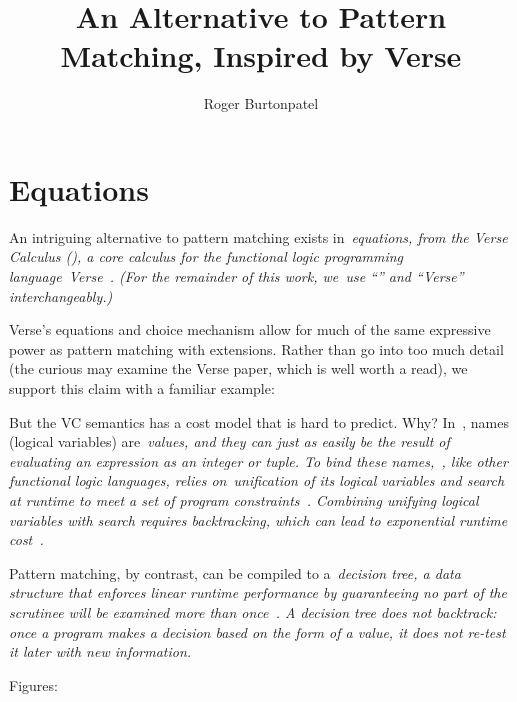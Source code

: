 \documentclass[manuscript,screen 12pt, nonacm]{acmart}
\title{An Alternative to Pattern Matching, Inspired by Verse}
\author{Roger Burtonpatel}
\affiliation{%
  \institution{Tufts University}
  \streetaddress{419 Boston Ave}
  \city{Medford}
  \state{Massachusetts}
  \country{USA}
  \postcode{02155}
}
\begin{document}
    
    \section{Equations}

    An intriguing alternative to pattern matching exists in~\it{equations}, from
    the Verse Calculus (\VC), a core calculus for the functional logic
    programming language~\it{Verse}~\citep{antoy2010functional,
    hanus2013functional, verse}. (For the remainder of this work, we~use “\VC”
    and “Verse” interchangeably.)

    Verse's equations and choice mechanism allow for much of the same expressive
    power as pattern matching with extensions. Rather than go into too much
    detail (the curious may examine the Verse paper, which is well worth a
    read), we support this claim with a familiar example: 


    But the VC semantics has a cost model that is hard to predict. Why? In~\VC,
    names (logical variables) are~\it{values}, and they can just as easily be
    the result of evaluating an expression as an integer or tuple. To bind these
    names,~\VC, like other functional logic languages, relies
    on~\it{unification} of its logical variables and \it{search} at runtime to
    meet a set of program constraints~\citep{antoy2010functional,
    hanus2013functional}. Combining unifying logical variables with search
    requires backtracking, which can lead to exponential runtime
    cost~\citep{hanus2013functional, wadler1985replace, clark1982introduction}. 


    Pattern matching, by contrast, can be compiled to a~\it{decision tree}, a
    data structure that enforces linear runtime performance by guaranteeing no
    part of the scrutinee will be examined more than once~\citep{maranget}. A
    decision tree does not backtrack: once a program makes a decision based on
    the form of a value, it does not re-test it later with new information. 
    

    Figures: 
\end{document}
